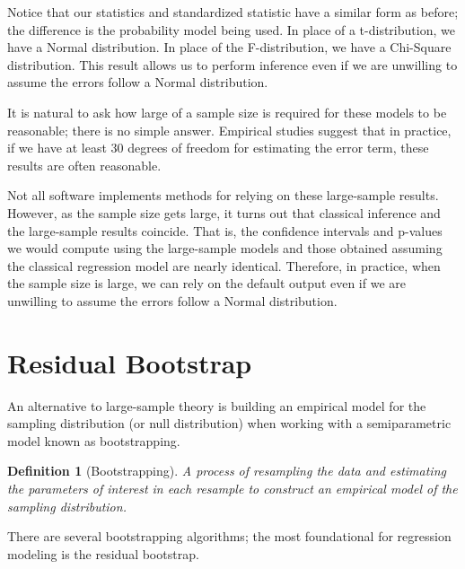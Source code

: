 \documentclass[
]{book}
\theoremstyle{plain}
\theoremstyle{mydefn}
\newtheorem{definition}{Definition}[chapter]
\theoremstyle{myexmpl}
\theoremstyle{remark}
\begin{document}
Notice that our statistics and standardized statistic have a similar form as before; the difference is the probability model being used. In place of a t-distribution, we have a Normal distribution. In place of the F-distribution, we have a Chi-Square distribution. This result allows us to perform inference even if we are unwilling to assume the errors follow a Normal distribution.

It is natural to ask how large of a sample size is required for these models to be reasonable; there is no simple answer. Empirical studies suggest that in practice, if we have at least 30 degrees of freedom for estimating the error term, these results are often reasonable.

\begin{rmdtip}
Not all software implements methods for relying on these large-sample results. However, as the sample size gets large, it turns out that classical inference and the large-sample results coincide. That is, the confidence intervals and p-values we would compute using the large-sample models and those obtained assuming the classical regression model are nearly identical. Therefore, in practice, when the sample size is large, we can rely on the default output even if we are unwilling to assume the errors follow a Normal distribution.
\end{rmdtip}

\hypertarget{residual-bootstrap}{%
\section{Residual Bootstrap}\label{residual-bootstrap}}

An alternative to large-sample theory is building an empirical model for the sampling distribution (or null distribution) when working with a semiparametric model known as bootstrapping.

\begin{definition}[Bootstrapping]
A process of resampling the data and estimating the parameters of interest in each resample to construct an empirical model of the sampling distribution.
\end{definition}

There are several bootstrapping algorithms; the most foundational for regression modeling is the residual bootstrap.
\end{document}
